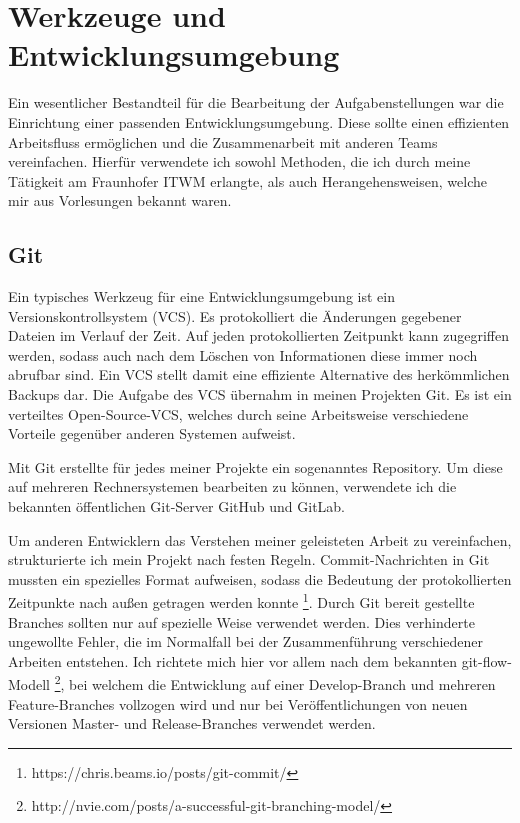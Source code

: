 \documentclass[crop=false]{standalone}
\begin{document}
  \section{Werkzeuge und Entwicklungsumgebung} %
  \label{sec:Werkzeuge und Entwicklungsumgebung}

  Ein wesentlicher Bestandteil für die Bearbeitung der Aufgabenstellungen war die Einrichtung einer passenden Entwicklungsumgebung.
  Diese sollte einen effizienten Arbeitsfluss ermöglichen und die Zusammenarbeit mit anderen Teams vereinfachen.
  Hierfür verwendete ich sowohl Methoden, die ich durch meine Tätigkeit am Fraunhofer ITWM erlangte, als auch Herangehensweisen, welche mir aus Vorlesungen bekannt waren.

  \subsection{Git} %
  \label{sub:git}
    Ein typisches Werkzeug für eine Entwicklungsumgebung ist ein Versionskontrollsystem (VCS).
    Es protokolliert die Änderungen gegebener Dateien im Verlauf der Zeit.
    Auf jeden protokollierten Zeitpunkt kann zugegriffen werden, sodass auch nach dem Löschen von Informationen diese immer noch abrufbar sind.
    Ein VCS stellt damit eine effiziente Alternative des herkömmlichen Backups dar.
    Die Aufgabe des VCS übernahm in meinen Projekten Git.
    Es ist ein verteiltes Open-Source-VCS, welches durch seine Arbeitsweise verschiedene Vorteile gegenüber anderen Systemen aufweist.

    Mit Git erstellte für jedes meiner Projekte ein sogenanntes Repository.
    Um diese auf mehreren Rechnersystemen bearbeiten zu können, verwendete ich die bekannten öffentlichen Git-Server GitHub und GitLab.

    Um anderen Entwicklern das Verstehen meiner geleisteten Arbeit zu vereinfachen, strukturierte ich mein Projekt nach festen Regeln.
    Commit-Nachrichten in Git mussten ein spezielles Format aufweisen, sodass die Bedeutung der protokollierten Zeitpunkte nach außen getragen werden konnte%
    \footnote{https://chris.beams.io/posts/git-commit/}.
    Durch Git bereit gestellte Branches sollten nur auf spezielle Weise verwendet werden.
    Dies verhinderte ungewollte Fehler, die im Normalfall bei der Zusammenführung verschiedener Arbeiten entstehen.
    Ich richtete mich hier vor allem nach dem bekannten git-flow-Modell%
    \footnote{http://nvie.com/posts/a-successful-git-branching-model/}, %
    bei welchem die Entwicklung auf einer Develop-Branch und mehreren Feature-Branches vollzogen wird und nur bei Veröffentlichungen von neuen Versionen Master- und Release-Branches verwendet werden.
\end{document}
